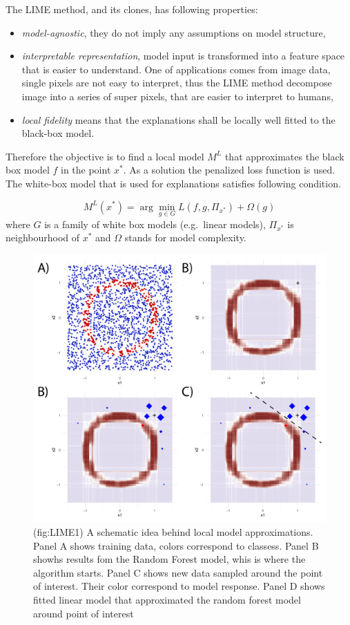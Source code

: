 \documentclass[]{krantz}
\providecommand{\tightlist}{%
  \setlength{\itemsep}{0pt}\setlength{\parskip}{0pt}}
\theoremstyle{definition}
\theoremstyle{definition}
\theoremstyle{definition}
\theoremstyle{remark}
\begin{document}
The LIME method, and its clones, has following properties:

\begin{itemize}
\tightlist
\item
  \emph{model-agnostic}, they do not imply any assumptions on model
  structure,
\item
  \emph{interpretable representation}, model input is transformed into a
  feature space that is easier to understand. One of applications comes
  from image data, single pixels are not easy to interpret, thus the
  LIME method decompose image into a series of super pixels, that are
  easier to interpret to humans,
\item
  \emph{local fidelity} means that the explanations shall be locally
  well fitted to the black-box model.
\end{itemize}

Therefore the objective is to find a local model \(M^L\) that
approximates the black box model \(f\) in the point \(x^*\). As a
solution the penalized loss function is used. The white-box model that
is used for explanations satisfies following condition.

\[
M^L(x^*) = \arg \min_{g \in G} L(f, g, \Pi_{x^*}) + \Omega (g) 
\] where \(G\) is a family of white box models (e.g.~linear models),
\(\Pi_{x^*}\) is neighbourhood of \(x^*\) and \(\Omega\) stands for
model complexity.

\begin{figure}

{\centering \includegraphics[width=0.7\linewidth]{figure/circle_4panels} 

}

\caption{(fig:LIME1) A schematic idea behind local model approximations. Panel A shows training data, colors correspond to classess. Panel B showhs results fom the Random Forest model, whis is where the algorithm starts. Panel C shows new data sampled around the point of interest. Their color correspond to model response. Panel D shows fitted linear model that approximated the random forest model around point of interest}\label{fig:LIME1}
\end{figure}
\end{document}
